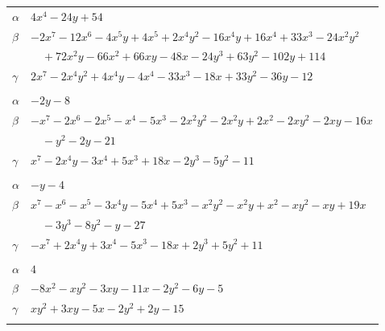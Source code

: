 \documentclass[11pt]{article}
\begin{document}
\begin{longtable}{@{}ll@{}}
$\alpha$ & $4x^{4}-24y+54$\\
$\beta$ & $-2x^{7}-12x^{6}-4x^{5}y+4x^{5}+2x^{4}y^{2}-16x^{4}y+16x^{4}+33x^{3}-24x^{2}y^{2}$\\
 & $\quad +72x^{2}y-66x^{2}+66xy-48x-24y^{3}+63y^{2}-102y+114$\\
$\gamma$ & $2x^{7}-2x^{4}y^{2}+4x^{4}y-4x^{4}-33x^{3}-18x+33y^{2}-36y-12$\\
\addlinespace[3pt]
\multicolumn{2}{@{}l}{$\{i,j\}=\{37,24\}$, $k_{ij}=2^{3}\cdot 3$}\\
$\alpha$ & $-2y-8$\\
$\beta$ & $-x^{7}-2x^{6}-2x^{5}-x^{4}-5x^{3}-2x^{2}y^{2}-2x^{2}y+2x^{2}-2xy^{2}-2xy-16x$\\
 & $\quad -y^{2}-2y-21$\\
$\gamma$ & $x^{7}-2x^{4}y-3x^{4}+5x^{3}+18x-2y^{3}-5y^{2}-11$\\
\addlinespace[3pt]
\multicolumn{2}{@{}l}{$\{i,j\}=\{37,29\}$, $k_{ij}=2^{2}\cdot 3$}\\
$\alpha$ & $-y-4$\\
$\beta$ & $x^{7}-x^{6}-x^{5}-3x^{4}y-5x^{4}+5x^{3}-x^{2}y^{2}-x^{2}y+x^{2}-xy^{2}-xy+19x$\\
 & $\quad -3y^{3}-8y^{2}-y-27$\\
$\gamma$ & $-x^{7}+2x^{4}y+3x^{4}-5x^{3}-18x+2y^{3}+5y^{2}+11$\\
\addlinespace[3pt]
\multicolumn{2}{@{}l}{$\{i,j\}=\{38,27\}$, $k_{ij}=2^{3}\cdot 3$}\\
$\alpha$ & $4$\\
$\beta$ & $-8x^{2}-xy^{2}-3xy-11x-2y^{2}-6y-5$\\
$\gamma$ & $xy^{2}+3xy-5x-2y^{2}+2y-15$\\
\addlinespace[3pt]
\end{longtable}
\endgroup
\end{document}
